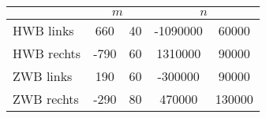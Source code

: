 \label{tab:geraden1}
	\begin{tabular}{lS[table-format=4.0]@{${}\pm{}$}S[table-format=2.0]S[table-format=8.0]@{${}\pm{}$}S[table-format=6.0]}
		\toprule
		{} &  &  \\
		\midrule
		{HWB links}  &  660 & 40 & -1090000 &  60000 \\
		{HWB rechts} & -790 & 60 &  1310000 &  90000 \\
		{ZWB links}  &  190 & 60 &  -300000 &  90000 \\
		{ZWB rechts} & -290 & 80 &   470000 & 130000 \\
		\bottomrule
	\end{tabular}
